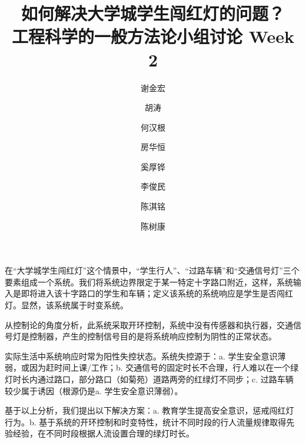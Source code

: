 \documentclass[UTF8]{ctexart}
\title{%
  如何解决大学城学生闯红灯的问题？\\
  \large 工程科学的一般方法论小组讨论 Week 2}
\author{
谢金宏 \and 胡涛 \and 何汉根 \and 房华恒
\and 奚厚铧 \and 李俊民 \and 陈淇铭 \and 陈树康
}
\begin{document}
\maketitle

在“大学城学生闯红灯”这个情景中，“学生行人”、“过路车辆”和“交通信号灯”三个要素组成一个系统。我们将系统边界限定于某一特定十字路口附近，这样，系统输入是即将进入该十字路口的学生和车辆；定义该系统的系统响应是学生是否闯红灯。显然，该系统属于时变系统。

从控制论的角度分析，此系统采取开环控制，系统中没有传感器和执行器，交通信号灯是控制器，产生的控制信号目的是将系统响应控制为阴性的正常状态。

实际生活中系统响应时常为阳性失控状态。系统失控源于：a. 学生安全意识薄弱，或因为赶时间上课/工作；b. 交通信号的固定时长不合理，行人难以在一个绿灯时长内通过路口，部分路口（如菊苑）道路两旁的红绿灯不同步；c. 过路车辆较少属于诱因（根源仍是a. 学生安全意识薄弱）。

基于以上分析，我们提出以下解决方案：a. 教育学生提高安全意识，惩戒闯红灯行为。b. 基于系统的开环控制和时变特性，统计不同时段的行人流量规律取得先验经验，在不同时段根据人流设置合理的绿灯时长。
\end{document}
